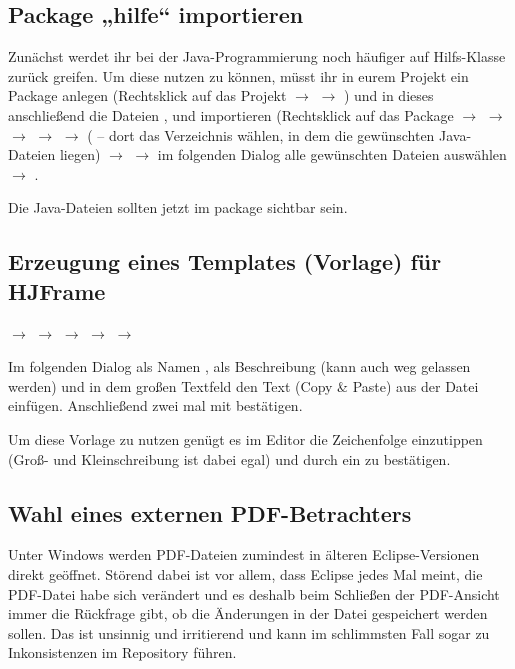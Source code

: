 \subsection{Package „hilfe“ importieren}

Zunächst werdet ihr bei der Java-Programmierung noch häufiger auf Hilfs-Klasse
 zurück greifen. Um diese nutzen zu können, müsst ihr in eurem
Projekt ein Package  anlegen (Rechtsklick auf das Projekt
$\rightarrow$  $\rightarrow$ ) und in dieses
anschließend die Dateien  ,  und
 importieren (Rechtsklick auf das Package
$\rightarrow$  $\rightarrow$ 
$\rightarrow$  $\rightarrow$  $\rightarrow$
 ( -- dort das Verzeichnis wählen, in dem
die gewünschten Java-Dateien liegen) $\rightarrow$  $\rightarrow$
im folgenden Dialog alle gewünschten Dateien auswählen $\rightarrow$
.

Die Java-Dateien sollten jetzt im package  sichtbar sein.

\subsection{Erzeugung eines Templates (Vorlage) für HJFrame}

 $\rightarrow$  $\rightarrow$ 
$\rightarrow$  $\rightarrow$  $\rightarrow$

Im folgenden Dialog als Namen , als Beschreibung (kann
auch weg gelassen werden)  und in dem großen Textfeld  den
Text (Copy \& Paste) aus der Datei  einfügen.
Anschließend zwei mal mit  bestätigen.

Um diese Vorlage zu nutzen genügt es im Editor die Zeichenfolge
 einzutippen (Groß- und Kleinschreibung ist dabei egal) und
durch ein  zu bestätigen.


\subsection{Wahl eines externen PDF-Betrachters}

Unter Windows werden PDF-Dateien zumindest in älteren Eclipse-Versionen direkt
geöffnet. Störend dabei ist vor allem, dass Eclipse jedes Mal meint, die
PDF-Datei habe sich verändert und es deshalb beim Schließen der PDF-Ansicht
immer die Rückfrage gibt, ob die Änderungen in der Datei gespeichert werden
sollen. Das ist unsinnig und irritierend und kann im schlimmsten Fall sogar zu
Inkonsistenzen im Repository führen.

